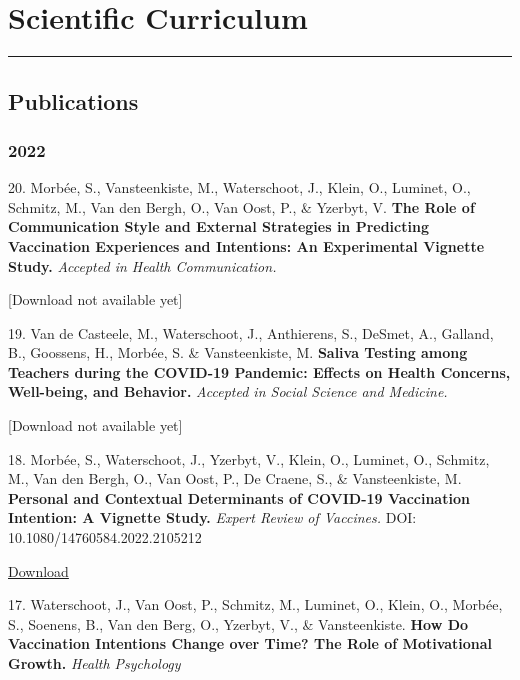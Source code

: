 \documentclass[
]{article}
\begin{document}
\hypertarget{scientific-curriculum}{%
\section{\texorpdfstring{Scientific Curriculum
}{Scientific Curriculum }}\label{scientific-curriculum}}

\begin{center}\rule{0.5\linewidth}{0.5pt}\end{center}

\hypertarget{publications}{%
\subsection{Publications}\label{publications}}

\hypertarget{section}{%
\subsubsection{2022}\label{section}}

20. Morbée, S., Vansteenkiste, M., Waterschoot, J., Klein, O., Luminet,
O., Schmitz, M., Van den Bergh, O., Van Oost, P., \& Yzerbyt, V.
\textbf{The Role of Communication Style and External Strategies in
Predicting Vaccination Experiences and Intentions: An Experimental
Vignette Study.} \emph{Accepted in Health Communication.}

{[}Download not available yet{]}

19. Van de Casteele, M., Waterschoot, J., Anthierens, S., DeSmet, A.,
Galland, B., Goossens, H., Morbée, S. \& Vansteenkiste, M.
\textbf{Saliva Testing among Teachers during the COVID-19 Pandemic:
Effects on Health Concerns, Well-being, and Behavior.} \emph{Accepted in
Social Science and Medicine.}

{[}Download not available yet{]}

18. Morbée, S., Waterschoot, J., Yzerbyt, V., Klein, O., Luminet, O.,
Schmitz, M., Van den Bergh, O., Van Oost, P., De Craene, S., \&
Vansteenkiste, M. \textbf{Personal and Contextual Determinants of
COVID-19 Vaccination Intention: A Vignette Study.} \emph{Expert Review
of Vaccines.} DOI: 10.1080/14760584.2022.2105212

\href{download/sciencs/studies/6bf4ef7e-6f91e-4512-8b9d-a71ae5f8700e.pdf}{Download
}

17. Waterschoot, J., Van Oost, P., Schmitz, M., Luminet, O., Klein, O.,
Morbée, S., Soenens, B., Van den Berg, O., Yzerbyt, V., \&
Vansteenkiste. \textbf{How Do Vaccination Intentions Change over Time?
The Role of Motivational Growth.} \emph{Health Psychology}
\end{document}
